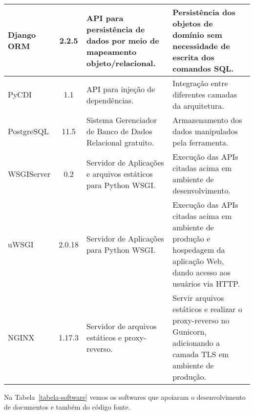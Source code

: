 \begin{table}[h]
\begin{tabular}{|p{1.6cm}|c|p{5cm}|p{6.5cm}|}
		Django ORM & 2.2.5 & API para persistência de dados por meio de mapeamento objeto/relacional. & Persistência dos objetos de domínio sem necessidade de escrita dos comandos SQL. \\\hline
		
		PyCDI & 1.1 & API para injeção de dependências. & Integração entre diferentes camadas da arquitetura. \\\hline
		
		
		
		PostgreSQL & 11.5 & Sistema Gerenciador de Banco de Dados Relacional gratuito. & Armazenamento dos dados manipulados pela ferramenta. \\\hline
		
		WSGIServer & 0.2 & Servidor de Aplicações e arquivos estáticos para Python WSGI. & Execução das APIs citadas acima em ambiente de desenvolvimento. \\ \hline
		
		uWSGI & 2.0.18 & Servidor de Aplicações para Python WSGI. & Execução das APIs citadas acima em ambiente de produção e hospedagem da aplicação Web, dando acesso aos usuários via HTTP. \\ \hline
		
		NGINX & 1.17.3 & Servidor de arquivos estáticos e proxy-reverso. & Servir arquivos estáticos e realizar o proxy-reverso no Gunicorn, adicionando a camada TLS em ambiente de produção. \\ \hline
	\end{tabular}
\end{table}







\newpage
Na Tabela~\ref{tabela-software} vemos os softwares que apoiaram o desenvolvimento de documentos e também do código fonte.

